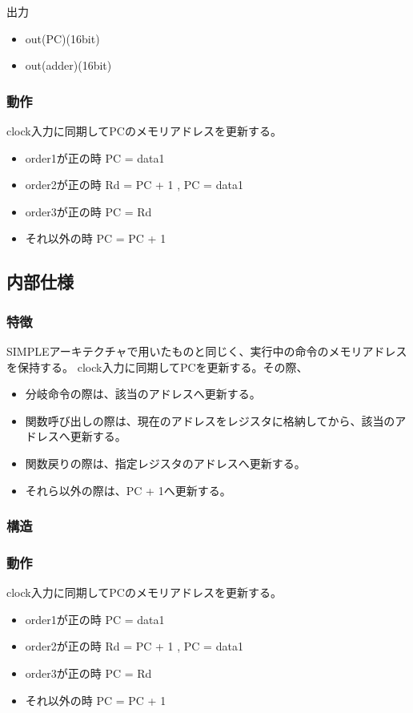 \documentclass{jsreport}
\begin{document}
            出力
            \begin{itemize}
            \item out(PC)(16bit)
            \item out(adder)(16bit)
            \end{itemize}
            
        \subsubsection{動作}
        clock入力に同期してPCのメモリアドレスを更新する。
        \begin{itemize}
        \item order1が正の時 PC = data1
		\item order2が正の時 Rd = PC + 1 , PC = data1
        \item order3が正の時 PC = Rd
        \item それ以外の時    PC = PC + 1
    	\end{itemize}
        
    \subsection{内部仕様}

        \subsubsection{特徴}
        SIMPLEアーキテクチャで用いたものと同じく、実行中の命令のメモリアドレスを保持する。                
            clock入力に同期してPCを更新する。その際、\\
            \begin{itemize}
            \item 分岐命令の際は、該当のアドレスへ更新する。
            \item 関数呼び出しの際は、現在のアドレスをレジスタに格納してから、該当のアドレスへ更新する。
            \item 関数戻りの際は、指定レジスタのアドレスへ更新する。
			\item それら以外の際は、PC + 1へ更新する。
            \end{itemize}
        
        \subsubsection{構造}
        
        
        \subsubsection{動作}    
        clock入力に同期してPCのメモリアドレスを更新する。
        \begin{itemize}
        \item order1が正の時 PC = data1
		\item order2が正の時 Rd = PC + 1 , PC = data1
        \item order3が正の時 PC = Rd
        \item それ以外の時    PC = PC + 1
    	\end{itemize}
        
\end{document}
